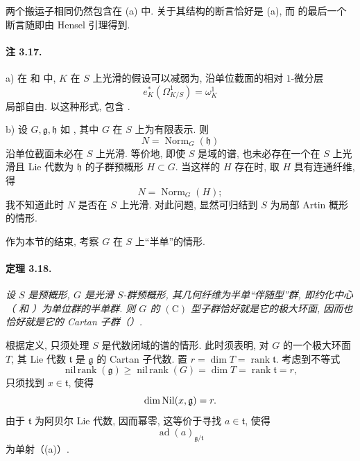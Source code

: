 两个搬运子相同仍然包含在 \textup{(a)} 中. 关于其结构的断言恰好是 \textup{(a)}, 而  的最后一个断言随即由 Hensel 引理得到.

\paragraph{\textbf{注 3.17.}}
\textup{a)}
在  和  中, \(K\) 在 \(S\) 上光滑的假设可以减弱为, 沿单位截面的相对 \(1\)-微分层
\[
  e_K^*(\Omega^1_{K/S})=\omega^1_K
\]
局部自由. 以这种形式,  包含 .

\smallskip
\noindent
\textup{b)}
设 \(G,\mathfrak g,\mathfrak h\) 如 , 其中 \(G\) 在 \(S\) 上为有限表示. 则
\[
  N=\operatorname{Norm}_G(\mathfrak h)
\]
沿单位截面未必在 \(S\) 上光滑. 等价地, 即使 \(S\) 是域的谱, 也未必存在一个在 \(S\) 上光滑且 Lie 代数为 \(\mathfrak h\) 的子群预概形 \(H\subset G\). 当这样的 \(H\) 存在时, 取 \(H\) 具有连通纤维, 得
\[
  N=\operatorname{Norm}_G(H);
\]
我不知道此时 \(N\) 是否在 \(S\) 上光滑. 对此问题, 显然可归结到 \(S\) 为局部 Artin 概形的情形.



作为本节的结束, 考察 \(G\) 在 \(S\) 上“半单”的情形.

\paragraph{\textbf{定理 3.18.}}
{\itshape 设 \(S\) 是预概形, \(G\) 是光滑 \(S\)-群预概形, 其几何纤维为半单“伴随型”群, 即约化中心\textup{（ 和 ）}为单位群的半单群. 则 \(G\) 的 \((\mathrm C)\) 型子群恰好就是它的极大环面, 因而也恰好就是它的 Cartan 子群\textup{（）}.}

根据定义, 只须处理 \(S\) 是代数闭域的谱的情形. 此时须表明, 对 \(G\) 的一个极大环面 \(T\), 其 Lie 代数 \(\mathfrak t\) 是 \(\mathfrak g\) 的 Cartan 子代数. 置 \(r=\dim T=\operatorname{rank}\mathfrak t\). 考虑到不等式
\[
  \operatorname{nil\,rank}(\mathfrak g)
  \geq
  \operatorname{nil\,rank}(G)
  =
  \dim T
  =
  \operatorname{rank}\mathfrak t
  =
  r,
\]
只须找到 \(x\in\mathfrak t\), 使得
\[
  \dim\operatorname{Nil}(x,\mathfrak g)=r.
\]
由于 \(\mathfrak t\) 为阿贝尔 Lie 代数, 因而幂零, 这等价于寻找 \(a\in\mathfrak t\), 使得
\[
  \operatorname{ad}(a)_{\mathfrak g/\mathfrak t}
\]
为单射\textup{（\textup{(a)}）}.

